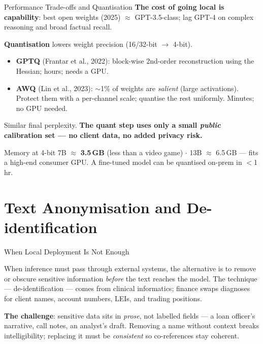 \documentclass[9pt,t]{beamer}
\begin{document}
\begin{frame}{Performance Trade-offs and Quantisation}
\textbf{The cost of going local is capability}: best open weights (2025) $\approx$
GPT-3.5-class; lag GPT-4 on complex reasoning and broad factual recall.

\medskip
\begin{underhood}
\textbf{Quantisation} lowers weight precision (16/32-bit $\to$ 4-bit).
\begin{itemize}
  \item \textbf{GPTQ} (Frantar et al., 2022): block-wise 2nd-order reconstruction
        using the Hessian; hours; needs a GPU.
  \item \textbf{AWQ} (Lin et al., 2023): $\sim$1\% of weights are \emph{salient}
        (large activations). Protect them with a per-channel scale; quantise the rest
        uniformly. Minutes; no GPU needed.
\end{itemize}
Similar final perplexity. \textbf{The quant step uses only a small \emph{public}
calibration set --- no client data, no added privacy risk.}
\end{underhood}

\medskip
\begin{block}{Memory at 4-bit}
7B $\approx$ \textbf{3.5\,GB} (less than a video game) $\cdot$ 13B $\approx$ 6.5\,GB
--- fits a high-end consumer GPU. A fine-tuned model can be quantised on-prem in $<$1 hr.
\end{block}
\end{frame}

\section{Text Anonymisation and De-identification}

\begin{frame}{When Local Deployment Is Not Enough}
\begin{bigpicture}
When inference must pass through external systems, the alternative is to remove or
obscure sensitive information \emph{before} the text reaches the model. The
technique --- de-identification --- comes from clinical informatics; finance swaps
diagnoses for client names, account numbers, LEIs, and trading positions.
\end{bigpicture}

\medskip
\textbf{The challenge}: sensitive data sits in \emph{prose}, not labelled fields ---
a loan officer's narrative, call notes, an analyst's draft. Removing a name without
context breaks intelligibility; replacing it must be \emph{consistent} so
co-references stay coherent.
\end{frame}
\end{document}
